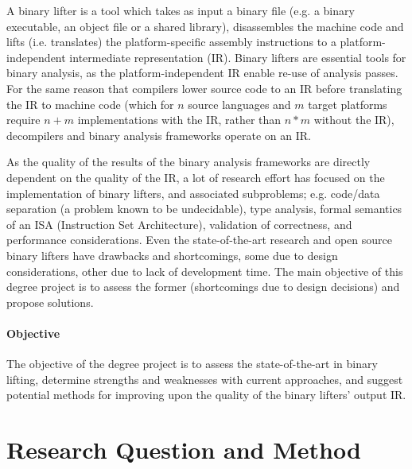 \documentclass[12pt, a4paper]{article}
\begin{document}
A binary lifter is a tool which takes as input a binary file (e.g. a binary executable, an object file or a shared library), disassembles the machine code and lifts (i.e. translates) the platform-specific assembly instructions to a platform-independent intermediate representation (IR). Binary lifters are essential tools for binary analysis, as the platform-independent IR enable re-use of analysis passes. For the same reason that compilers lower source code to an IR before translating the IR to machine code (which for $n$ source languages and $m$ target platforms require $n + m$ implementations with the IR, rather than $n * m$ without the IR), decompilers and binary analysis frameworks operate on an IR.

As the quality of the results of the binary analysis frameworks are directly dependent on the quality of the IR, a lot of research effort has focused on the implementation of binary lifters, and associated subproblems; e.g. code/data separation (a problem known to be undecidable), type analysis, formal semantics of an ISA (Instruction Set Architecture), validation of correctness, and performance considerations. Even the state-of-the-art research and open source binary lifters have drawbacks and shortcomings, some due to design considerations, other due to lack of development time. The main objective of this degree project is to assess the former (shortcomings due to design decisions) and propose solutions.


\paragraph{Objective}

The objective of the degree project is to assess the state-of-the-art in binary lifting, determine strengths and weaknesses with current approaches, and suggest potential methods for improving upon the quality of the binary lifters' output IR.


\section{Research Question and Method}

\end{document}
